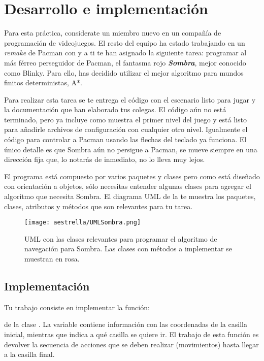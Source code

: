 \section{Desarrollo e implementaci\'on}

Para esta práctica, considerate un miembro nuevo en un compañía de programación de videojuegos.  El resto del equipo ha estado trabajando en un \textit{remake} de Pacman con  y a ti te han asignado la siguiente tarea: programar al más férreo perseguidor de Pacman, el fantasma rojo \textbf{\textit{Sombra}}, mejor conocido como Blinky. Para ello, has decidido utilizar el mejor algoritmo para mundos finitos deterministas, A*.

Para realizar esta tarea se te entrega el código con el escenario listo para jugar y la documentación que han elaborado tus colegas.  El código aún no está terminado, pero ya incluye como muestra el primer nivel del juego y está listo para añadirle archivos de configuración con cualquier otro nivel.  Igualmente el código para controlar a Pacman usando las flechas del teclado ya funciona.  El único detalle es que Sombra aún no persigue a Pacman, se mueve siempre en una dirección fija que, lo notarás de inmediato, no lo lleva muy lejos.

El programa está compuesto por varios paquetes y clases pero como está diseñado con orientación a objetos, sólo necesitas entender algunas clases para agregar el algoritmo que necesita Sombra.  El diagrama UML de la  te muestra los paquetes, clases, atributos y métodos que son relevantes para tu tarea.

\begin{sidewaysfigure}
  \centering
  \texttt{[image: aestrella/UMLSombra.png]}
  \caption{UML con las clases relevantes para programar el algoritmo de navegación para Sombra.  Las clases con métodos a implementar se muestran en rosa.}
  \label{fig:umlestrella}
\end{sidewaysfigure}

\subsection{Implementaci\'on}

Tu trabajo consiste en implementar la función:


\noindent de la clase .
La variable  contiene información con las coordenadas de la casilla inicial, mientras que  indica a qué casilla se quiere ir.  El trabajo de esta función es devolver la secuencia de acciones que se deben realizar (movimientos) hasta llegar a la casilla final.

